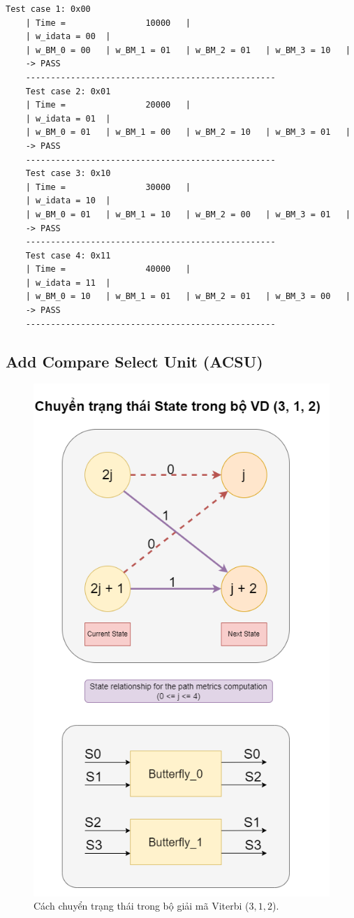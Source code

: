 \begin{lstlisting}[style=StyleResult, language=Result, caption={The Result of testing BMU}]
	Test case 1: 0x00
	| Time =                10000 	|
	| w_idata = 00 	|
	| w_BM_0 = 00 	| w_BM_1 = 01 	| w_BM_2 = 01 	| w_BM_3 = 10 	|
	-> PASS
	--------------------------------------------------
	Test case 2: 0x01
	| Time =                20000 	|
	| w_idata = 01 	|
	| w_BM_0 = 01 	| w_BM_1 = 00 	| w_BM_2 = 10 	| w_BM_3 = 01 	|
	-> PASS
	--------------------------------------------------
	Test case 3: 0x10
	| Time =                30000 	|
	| w_idata = 10 	|
	| w_BM_0 = 01 	| w_BM_1 = 10 	| w_BM_2 = 00 	| w_BM_3 = 01 	|
	-> PASS
	--------------------------------------------------
	Test case 4: 0x11
	| Time =                40000 	|
	| w_idata = 11 	|
	| w_BM_0 = 10 	| w_BM_1 = 01 	| w_BM_2 = 01 	| w_BM_3 = 00 	|
	-> PASS
	--------------------------------------------------
\end{lstlisting}

\subsection{Add Compare Select Unit (ACSU)}

\begin{figure}[H]
	\centering
	\includegraphics[width=.6\linewidth]{sections/pic/mophongbangSystemVerilog/ACSU_proc_state.png}
	\caption{Cách chuyển trạng thái trong bộ giải mã Viterbi ($3, 1, 2$).}
\end{figure}

